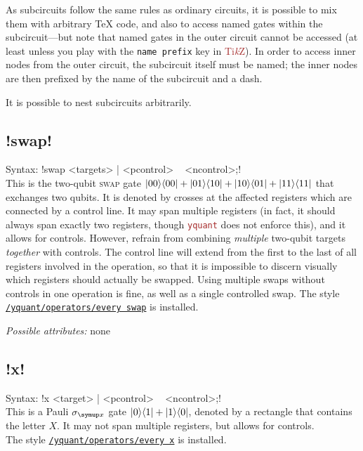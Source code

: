 \documentclass{scrartcl}
\def\TikZ{\textcolor{brown}{Ti\textit kZ}}
\def\pkg#1{\textcolor{brown}{\texttt{#1}}}
\def\style#1{\hyperref[style:#1]{\texttt{#1}}}
\def\Yquant{\pkg{yquant}}
\def\ketbra#1#2{\ket{#1}\!\bra{#2}}
\begin{document}
\begin{itemize}
               As subcircuits follow the same rules as ordinary circuits, it is possible to mix them with arbitrary \TeX{} code, and also to access named gates within the subcircuit---but note that named gates in the outer circuit cannot be accessed (at least unless you play with the \texttt{name prefix} key in \TikZ).
               In order to access inner nodes from the outer circuit, the subcircuit itself must be named; the inner nodes are then prefixed by the name of the subcircuit and a dash.

               It is possible to nest subcircuits arbitrarily.
         \end{itemize}

      \subsection{\texorpdfstring{\yquant!swap!}{swap}}\label{gate:swap}
         Syntax: \yquant!swap <targets> | <pcontrol> ~ <ncontrol>;! \\
         This is the two\hyp qubit \textsc{swap} gate $\ketbra{00}{00} + \ketbra{01}{10} + \ketbra{10}{01} + \ketbra{11}{11}$ that exchanges two qubits.
         It is denoted by crosses at the affected registers which are connected by a control line.
         It may span multiple registers (in fact, it should always span exactly two registers, though \Yquant{} does not enforce this), and it allows for controls.
         However, refrain from combining \emph{multiple} two\hyp qubit targets \emph{together} with controls.
         The control line will extend from the first to the last of all registers involved in the operation, so that it is impossible to discern visually which registers should actually be swapped.
         Using multiple swaps without controls in one operation is fine, as well as a single controlled swap.
         The style \style{/yquant/operators/every swap} is installed.

         \emph{Possible attributes:} none

      \subsection{\texorpdfstring{\yquant!x!}{x}}\label{gate:x}
         Syntax: \yquant!x <target> | <pcontrol> ~ <ncontrol>;! \\
         This is a Pauli $\sigma_{\symup x}$ gate $\ketbra01 + \ketbra10$, denoted by a rectangle that contains the letter $X$.
         It may not span multiple registers, but allows for controls. \\
         The style \style{/yquant/operators/every x} is installed.
\end{document}

